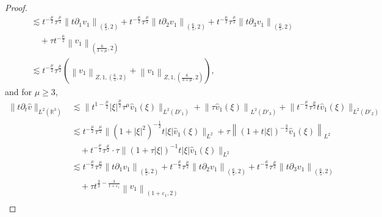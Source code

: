 \documentclass[11pt,twoside]{article}
\newcommand{\R}{\mathbb R}
\newcommand{\p}{\partial}
\newcommand{\f}{\frac}
\theoremstyle{plain}
\theoremstyle{definition}
\theoremstyle{remark}
\numberwithin{equation}{section}
\begin{document}
\begin{proof}
\begin{equation}
\begin{aligned}
& \lesssim t^{-\f{\mu}{2}} \tau^{\f{\mu}{2}} \left\|t\p_1v_1\right\|_{\left(\f65, 2\right)}+t^{-\f{\mu}{2}} \tau^{\f{\mu}{2}} \left\|t\p_2v_1\right\|_{\left(\f65, 2\right)}+t^{-\f{\mu}{2}} \tau^{\f{\mu}{2}} \left\|t\p_3v_1\right\|_{\left(\f65, 2\right)}\\
&\quad+\tau t^{-\f{\mu}{2}}\left\|v_1\right\|_{\left(\f{6}{3+\mu}, 2\right)} \\
& \lesssim t^{-\f{\mu}{2}} \tau^{\f{\mu}{2}}(\left\|v_1\right\|_{Z, 1, \left(\f65, 2\right)}+\left\|v_1\right\|_{Z, 1, \left(\f{6}{3+\mu}, 2\right)}),
\end{aligned}
\end{equation}
and for $\mu\geq3$,
\begin{equation*}\label{l15}
\begin{aligned}
\|t\p_t\hat{v}\|_{L^2(\R^3)} & \lesssim\big\|t^{1-\frac{\mu}{2}} |\xi|^{\frac{\mu}{2}}\tau^{\mu} \hat{v}_1(\xi)\big\|_{L^2(D'_1)}+\left\| \tau \hat{v}_1(\xi)\right\|_{L^2(D'_3)} +\big\|t^{-\frac{\mu}{2}}\tau^{\frac{\mu}{2}} t \hat{v}_1(\xi)\big\|_{L^2(D'_2)} \\
& \lesssim t^{-\frac{\mu}{2}}\tau^{\frac{\mu}{2}}\big\| (1+|\xi|^2)^{-\f12}t|\xi|  \hat{v}_1(\xi)\big\|_{L^2}+\tau\left\| (1+t|\xi|)^{-\f32} \hat{v}_1(\xi)\right\|_{L^2}\\ &\quad+t^{-\frac{\mu}{2}}\tau^{\frac{\mu}{2}}\cdot\tau\big\| (1+\tau|\xi|)^{-1}t|\xi|  \hat{v}_1(\xi)\big\|_{L^2} \\
& \lesssim t^{-\f{\mu}{2}} \tau^{\f{\mu}{2}} \left\|t\p_1v_1\right\|_{\left(\f65, 2\right)}+t^{-\f{\mu}{2}} \tau^{\f{\mu}{2}} \left\|t\p_2v_1\right\|_{\left(\f65, 2\right)}+t^{-\f{\mu}{2}} \tau^{\f{\mu}{2}} \left\|t\p_3v_1\right\|_{\left(\f65, 2\right)}\\
&\quad+\tau t^{\f32-\frac{3}{1+\varepsilon_1}}\left\|v_1\right\|_{\left(1+\varepsilon_1, 2\right)} \\
\end{aligned}
\end{equation*}



\end{proof}
\end{document}
